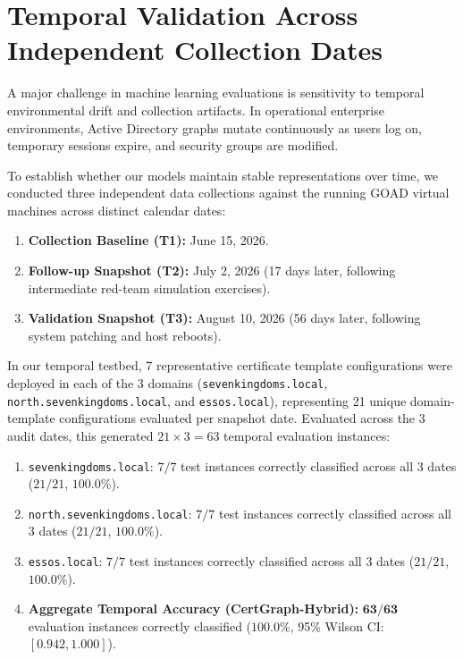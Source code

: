 \section{Temporal Validation Across Independent Collection Dates}
A major challenge in machine learning evaluations is sensitivity to temporal environmental drift and collection artifacts. In operational enterprise environments, Active Directory graphs mutate continuously as users log on, temporary sessions expire, and security groups are modified.

To establish whether our models maintain stable representations over time, we conducted three independent data collections against the running GOAD virtual machines across distinct calendar dates:
\begin{enumerate}
    \item \textbf{Collection Baseline (T1):} June 15, 2026.
    \item \textbf{Follow-up Snapshot (T2):} July 2, 2026 (17 days later, following intermediate red-team simulation exercises).
    \item \textbf{Validation Snapshot (T3):} August 10, 2026 (56 days later, following system patching and host reboots).
\end{enumerate}

In our temporal testbed, 7 representative certificate template configurations were deployed in each of the 3 domains (\texttt{sevenkingdoms.local}, \texttt{north.sevenkingdoms.local}, and \texttt{essos.local}), representing 21 unique domain-template configurations evaluated per snapshot date. Evaluated across the 3 audit dates, this generated $21 \times 3 = 63$ temporal evaluation instances:
\begin{enumerate}
    \item \texttt{sevenkingdoms.local}: $7 / 7$ test instances correctly classified across all 3 dates ($21 / 21$, $100.0\%$).
    \item \texttt{north.sevenkingdoms.local}: $7 / 7$ test instances correctly classified across all 3 dates ($21 / 21$, $100.0\%$).
    \item \texttt{essos.local}: $7 / 7$ test instances correctly classified across all 3 dates ($21 / 21$, $100.0\%$).
    \item \textbf{Aggregate Temporal Accuracy (CertGraph-Hybrid):} $\mathbf{63 / 63}$ evaluation instances correctly classified ($\mathbf{100.0\%}$, 95\% Wilson CI: $[0.942, 1.000]$).
\end{enumerate}

